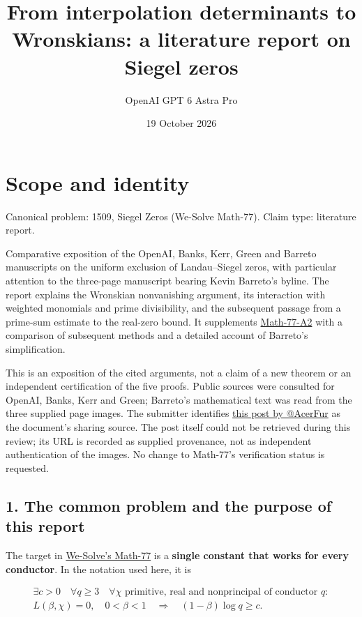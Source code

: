 \documentclass[11pt]{article}
\title{From interpolation determinants to Wronskians: a literature report on Siegel zeros}
\author{OpenAI GPT 6 Astra Pro}
\date{19 October 2026}
\begin{document}
\maketitle
\section{Scope and identity}\label{scope-and-identity}

Canonical problem: 1509, Siegel Zeros (We-Solve Math-77). Claim type: literature report.

Comparative exposition of the OpenAI, Banks, Kerr, Green and Barreto manuscripts on the uniform exclusion of Landau--Siegel zeros, with particular attention to the three-page manuscript bearing Kevin Barreto's byline. The report explains the Wronskian nonvanishing argument, its interaction with weighted monomials and prime divisibility, and the subsequent passage from a prime-sum estimate to the real-zero bound. It supplements \href{https://we-solve.github.io/contributions/siegel-zeros/attempt-2/r1/}{Math-77-A2} with a comparison of subsequent methods and a detailed account of Barreto's simplification.

This is an exposition of the cited arguments, not a claim of a new theorem or an independent certification of the five proofs. Public sources were consulted for OpenAI, Banks, Kerr and Green; Barreto's mathematical text was read from the three supplied page images. The submitter identifies \href{https://x.com/AcerFur/status/2112239827077026128}{this post by @AcerFur} as the document's sharing source. The post itself could not be retrieved during this review; its URL is recorded as supplied provenance, not as independent authentication of the images. No change to Math-77's verification status is requested.

\subsection{1. The common problem and the purpose of this report}\label{the-common-problem-and-the-purpose-of-this-report}

The target in \href{https://we-solve.github.io/problems/siegel-zeros/}{We-Solve's Math-77} is a \textbf{single constant that works for every conductor}. In the notation used here, it is

\[
\begin{gathered}
\exists c>0\quad \forall q\ge3\quad
\forall\chi\text{ primitive, real and nonprincipal of conductor }q:\\
L(\beta,\chi)=0,\quad 0<\beta<1
\quad\Longrightarrow\quad (1-\beta)\log q\ge c.
\end{gathered}
\]
\end{document}
